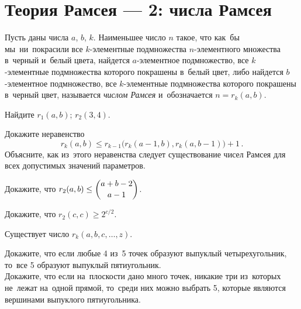
\section*{Теория Рамсея --- 2: числа Рамсея}


Пусть даны числа $a$, $b$, $k$.
Наименьшее число $n$ такое, что как~бы мы~ни~покрасили все
$k$-элементные подмножества $n$-элементного множества в~черный и~белый цвета,
найдется $a$-элементное подмножество, все $k$-элементные подмножества
которого покрашены в~белый цвет, либо найдется $b$-элементное подмножество,
все $k$-элементные подмножества которого покрашены в~черный цвет, называется
\emph{числом Рамсея} и~обозначается $n = r_k(a, b)$.

\begin{problems}

\item
Найдите
\quad
\subproblem $r_1(a, b)$;
\quad
\subproblem $r_2(3, 4)$.

\item
Докажите неравенство
\[
    r_{k}(a, b)
\leq
    r_{k-1} \bigl( r_{k}(a - 1, b), r_k(a, b - 1) \bigr) + 1
\, . \]
Объясните, как из~этого неравенства следует существование чисел Рамсея для всех
допустимых значений параметров.

\item
Докажите, что
\(
    r_2(a, b) \leq \dbinom{a + b - 2}{a - 1}
\)\;.

\item
Докажите, что $r_2(c, c) \geq 2^{c / 2}$.

\item{}
Существует число $r_{k}(a, b, c, \ldots, z)$.


\item{}
\subproblem
Докажите, что если любые 4 из~5 точек образуют выпуклый четырехугольник,
то~все 5 образуют выпуклый пятиугольник.
\\
\subproblem
Докажите, что если на~плоскости дано много точек, никакие три из~которых
не~лежат на~одной прямой, то~среди них можно выбрать 5, которые являются
вершинами выпуклого пятиугольника.

\end{problems}

